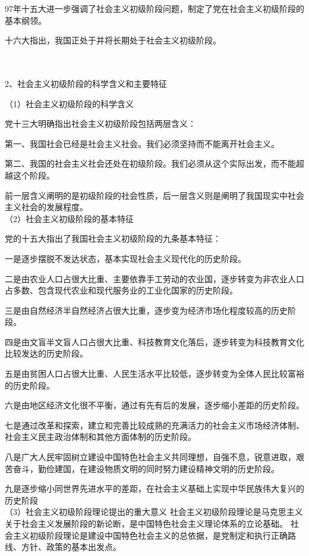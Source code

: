 \documentclass{ctexart}
\begin{document}
97年十五大进一步强调了社会主义初级阶段问题，制定了党在社会主义初级阶段的基本纲领。

十六大指出，我国正处于并将长期处于社会主义初级阶段。



\\\\

2、社会主义初级阶段的科学含义和主要特征

（1）社会主义初级阶段的科学含义

党十三大明确指出社会主义初级阶段包括两层含义：

第一、我国社会已经是社会主义社会。我们必须坚持而不能离开社会主义。

第二、我国的社会主义社会还处在初级阶段。我们必须从这个实际出发，而不能超越这个阶段。

前一层含义阐明的是初级阶段的社会性质，后一层含义则是阐明了我国现实中社会主义社会的发展程度。
\\
（2）社会主义初级阶段的基本特征

党的十五大指出了我国社会主义初级阶段的九条基本特征：

一是逐步摆脱不发达状态，基本实现社会主义现代化的历史阶段。

二是由农业人口占很大比重、主要依靠手工劳动的农业国，逐步转变为非农业人口占多数、包含现代农业和现代服务业的工业化国家的历史阶段。

三是由自然经济半自然经济占很大比重，逐步变为经济市场化程度较高的历史阶段。

四是由文盲半文盲人口占很大比重、科技教育文化落后，逐步转变为科技教育文化比较发达的历史阶段。

五是由贫困人口占很大比重、人民生活水平比较低，逐步转变为全体人民比较富裕的历史阶段。

六是由地区经济文化很不平衡，通过有先有后的发展，逐步缩小差距的历史阶段。

七是通过改革和探索，建立和完善比较成熟的充满活力的社会主义市场经济体制、社会主义民主政治体制和其他方面体制的历史阶段。

八是广大人民牢固树立建设中国特色社会主义共同理想，自强不息，锐意进取，艰苦奋斗，勤俭建国，在建设物质文明的同时努力建设精神文明的历史阶段。

九是逐步缩小同世界先进水平的差距，在社会主义基础上实现中华民族伟大复兴的历史阶段
\\
（3）社会主义初级阶段理论提出的重大意义
社会主义初级阶段理论是马克思主义关于社会主义发展阶段的新论断，是中国特色社会主义理论体系的立论基础。
社会主义初级阶段理论是建设中国特色社会主义的总依据，是党制定和执行正确路线、方针、政策的基本出发点。
\\\\
\end{document}
